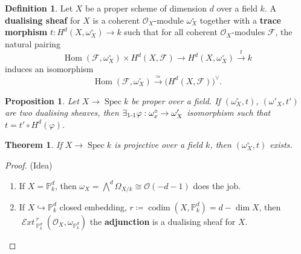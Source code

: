 \documentclass[12pt]{article}
\DeclareMathOperator{\Hom}{Hom}
\DeclareMathOperator{\Spec}{Spec}
\DeclareMathOperator{\codim}{codim}
\DeclareMathOperator{\shExt}{\mathcal E\textit{xt}\,}
\newtheorem*{proposition}{Proposition}
\newtheorem*{theorem}{Theorem}
\theoremstyle{definition}
\newtheorem*{definition}{Definition}
\begin{document}
\begin{definition}
Let $X$ be a proper scheme of dimension $d$ over a field $k$. A \textbf{dualising sheaf} for $X$ is a coherent $\mathcal O_X$-module $\omega_X^\circ$ together with a \textbf{trace morphism} $t:H^d(X,\omega_X^\circ)\rightarrow k$ such that for all coherent $\mathcal O_X$-modules $\mathcal F$, the natural pairing
\[\Hom(\mathcal F,\omega_X^\circ)\times H^d(X,\mathcal F)\longrightarrow H^d(X,\omega_X^\circ)\overset t\longrightarrow k\]
induces an isomorphism
\[\Hom(\mathcal F,\omega_X^\circ)\overset\simeq\longrightarrow\big(H^d(X,\mathcal F)\big)^\vee.\]
\end{definition}

\begin{proposition}
Let $X\rightarrow\Spec k$ be proper over a field. If $(\omega_X^\circ,t)$, $(\omega'_X,t')$ are two dualising sheaves, then $\exists_{1\text-1}\varphi:\omega_x^\circ\rightarrow\omega'_X$ isomorphism such that $t=t'\circ H^d(\varphi)$.
\end{proposition}

\begin{theorem}
If $X\rightarrow\Spec k$ is projective over a field $k$, then $(\omega_X^\circ,t)$ exists.
\end{theorem}

\begin{proof}
(Idea)
\begin{enumerate}[label=\arabic*)]
\item If $X=\mathbb P_k^d$, then $\omega_X=\bigwedge^d\Omega_{X/k}\cong\mathcal O(-d-1)$ does the job.

\item If $X\hookrightarrow\mathbb P_k^d$ closed embedding, $r\coloneqq\codim(X,\mathbb P_k^d)=d-\dim X$, then $\shExt_{\mathbb P_k^d}^r(\mathcal O_X,\omega_{\mathbb P_k^d})$ the \textbf{adjunction} is a dualising sheaf for $X$.
\end{enumerate}
\end{proof}
\end{document}
